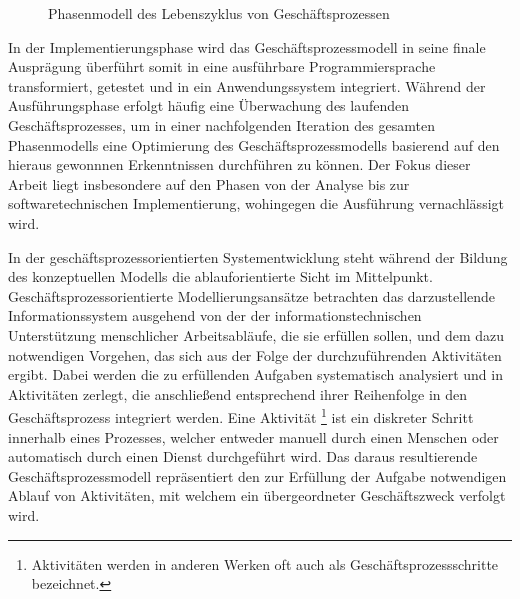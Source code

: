 \begin{figure}[H]
	\centering 
    \caption[Phasenmodell bei der Automatisierung von Geschäftsprozessen]
    {Phasenmodell des Lebenszyklus von Geschäftsprozessen \protect\footnotemark}
    \label{fig:Phasenmodell bei der Automatisierung von Geschäftsprozessen}
\end{figure}

In der Implementierungsphase wird das Geschäftsprozessmodell in seine finale Ausprägung überführt somit in eine ausführbare Programmiersprache transformiert, getestet und in ein Anwendungssystem integriert.
Während der Ausführungsphase erfolgt häufig eine Überwachung des laufenden Geschäftsprozesses, um in einer nachfolgenden Iteration des gesamten Phasenmodells eine Optimierung des Geschäftsprozessmodells basierend auf den hieraus gewonnnen Erkenntnissen durchführen zu können.
Der Fokus dieser Arbeit liegt insbesondere auf den Phasen von der Analyse bis zur softwaretechnischen Implementierung, wohingegen die Ausführung vernachlässigt wird.

In der geschäftsprozessorientierten Systementwicklung steht während der Bildung des konzeptuellen Modells die ablauforientierte Sicht im Mittelpunkt.
Geschäftsprozessorientierte Modellierungsansätze betrachten das darzustellende Informationssystem ausgehend von der der informationstechnischen Unterstützung menschlicher Arbeitsabläufe, die sie erfüllen sollen, und dem dazu notwendigen Vorgehen, das sich aus der Folge der durchzuführenden Aktivitäten ergibt.
Dabei werden die zu erfüllenden Aufgaben systematisch analysiert und in Aktivitäten zerlegt, die anschließend entsprechend ihrer Reihenfolge in den Geschäftsprozess integriert werden.
Eine Aktivität \footnote{Aktivitäten werden in anderen Werken oft auch als Geschäftsprozessschritte bezeichnet.} ist ein diskreter Schritt innerhalb eines Prozesses, welcher entweder manuell durch einen Menschen oder automatisch durch einen Dienst durchgeführt wird.
Das daraus resultierende Geschäftsprozessmodell repräsentiert den zur Erfüllung der Aufgabe notwendigen Ablauf von Aktivitäten, mit welchem ein übergeordneter Geschäftszweck verfolgt wird.

